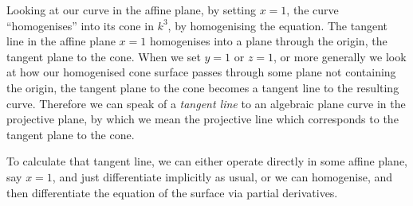 Looking at our curve in the affine plane, by setting \(x=1\), the curve ``homogenises'' into its cone in \(k^3\), by homogenising the equation. 
The tangent line in the affine plane \(x=1\) homogenises into a plane through the origin, the tangent plane to the cone.
When we set \(y=1\) or \(z=1\), or more generally we look at how our homogenised cone surface passes through some plane not containing the origin, the tangent plane to the cone becomes a tangent line to the resulting curve.
Therefore we can speak of a \emph{tangent line} to an algebraic plane curve in the projective plane, by which we mean the projective line which corresponds to the tangent plane to the cone.

To calculate that tangent line, we can either operate directly in some affine plane, say \(x=1\), and just differentiate implicitly as usual, or we can homogenise, and then differentiate the equation of the surface via partial derivatives.

